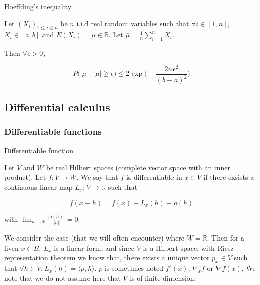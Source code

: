 \documentclass[
10pt, %
a4paper, %
oneside, %
headinclude,footinclude, %
BCOR5mm, %
]{scrartcl}
\begin{document}
\begin{theorem}{Hoeffding's inequality}

    Let $(X_i)_{1\leq i\leq n}$ be $n$ i.i.d real random variables such that $\forall i\in [1, n]$, $X_i\in [a,b]$ and $ E(X_i)= \mu \in \mathbb{R} $.  Let $	\bar{\mu} = \frac{1}{n} \sum^{n}_{i=1} X_i$.

    Then $\forall \epsilon >0$,

    \begin{equation*}
	P\Big(| \bar{\mu}-\mu|\geq \epsilon \Big) \leq 2 \exp\Big( -\frac{2n\epsilon^2}{(b-a)^2} \Big)
    \end{equation*}
\end{theorem}

\subsection{\large\color{MidnightBlue}Differential calculus}

\subsubsection{\large\color{Periwinkle}Differentiable functions}

\begin{definition}{Differentiable function}
    \label{def:diff}

    Let $V$ and $W$ be real Hilbert spaces (complete vector space with an inner product). Let $f: V\rightarrow W $. We say that $f$ is differentiable in $x\in V$ if there exsists a continuous linear map $L_x:V\rightarrow \mathbb{R} $ such that

    \begin{equation*}
	f(x+h)=f(x)+L_x(h)+o(h)
    \end{equation*}

    with $ \lim_{h\rightarrow 0} \frac{|o(h)|}{||h||} =0$.
\end{definition}

\begin{remark}

    We consider the case (that we will often encounter) where $W= \mathbb{R}$. Then for a fiven $x\in B$, $L_x$ is a linear form, and since $V$ is a Hilbert space, with Riesz representation theorem we know that, there exists a unique vector $p_x\in V$ such that $\forall h\in V, L_x(h)= \langle p, h \rangle$. $p$ is sometimes noted $f'(x)$,  $ \nabla_xf$ or $\nabla f(x)$. We note that we do not assume here that $V$ is of finite dimension.
    
\end{remark}
\end{document}
